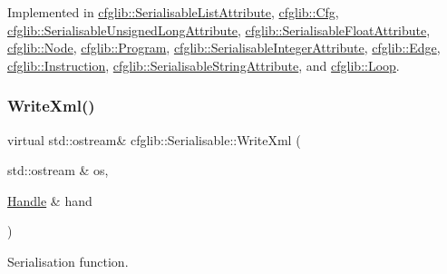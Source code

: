 Implemented in \hyperlink{classcfglib_1_1SerialisableListAttribute_a70350e44db8c97a8abfcf2d6bce82151}{cfglib\+::\+Serialisable\+List\+Attribute}, \hyperlink{classcfglib_1_1Cfg_a3525e0c748971e945193da2a0dd4b571}{cfglib\+::\+Cfg}, \hyperlink{classcfglib_1_1SerialisableUnsignedLongAttribute_acbd51f33a309bb606b7182ab0d49463b}{cfglib\+::\+Serialisable\+Unsigned\+Long\+Attribute}, \hyperlink{classcfglib_1_1SerialisableFloatAttribute_a622fedde5c15cc5fe891d57c932d5355}{cfglib\+::\+Serialisable\+Float\+Attribute}, \hyperlink{classcfglib_1_1Node_aaab769075e5d02c61411d58fc94e2070}{cfglib\+::\+Node}, \hyperlink{classcfglib_1_1Program_ad854304f1126c700757fb461a36c8cbd}{cfglib\+::\+Program}, \hyperlink{classcfglib_1_1SerialisableIntegerAttribute_ab1a2955d8dc60ee2a23e819c1f9d4386}{cfglib\+::\+Serialisable\+Integer\+Attribute}, \hyperlink{classcfglib_1_1Edge_af7eb95612c30e993771c519a2240cd77}{cfglib\+::\+Edge}, \hyperlink{classcfglib_1_1Instruction_a993641abc0297a715f66040d6ad7444c}{cfglib\+::\+Instruction}, \hyperlink{classcfglib_1_1SerialisableStringAttribute_aa001915e6a54ea8549b4e44da4cade74}{cfglib\+::\+Serialisable\+String\+Attribute}, and \hyperlink{classcfglib_1_1Loop_a9bca6f0b552a7863259d34611dff7b4a}{cfglib\+::\+Loop}.

\mbox{\label{classcfglib_1_1Serialisable_aaeb80cc7397ad312e5ae34f39412ce42}} 
\subsubsection{\texorpdfstring{Write\+Xml()}{WriteXml()}}
{\footnotesize\ttfamily virtual std\+::ostream\& cfglib\+::\+Serialisable\+::\+Write\+Xml (\begin{DoxyParamCaption}\item[{std\+::ostream \&}]{os,  }\item[{\hyperlink{classcfglib_1_1Handle}{Handle} \&}]{hand }\end{DoxyParamCaption})\hspace{0.3cm}{\ttfamily [pure virtual]}}

Serialisation function. 

